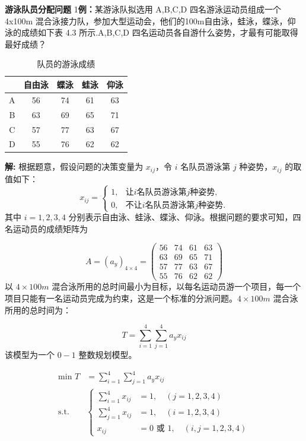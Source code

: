     \begin{exbox}{\textbf{游泳队员分配问题}}
        1\textbf{例：}某游泳队拟选用 A,B,C,D 四名游泳运动员组成一个 4x100m 混合泳接力队，参加大型运动会，他们的100m自由泳，蛙泳，蝶泳，仰泳的成绩如下表 4.3 所示.A,B,C,D 四名运动员各自游什么姿势，才最有可能取得最好成绩？
        \begin{table}[H]
            \centering
            \label{tab:4.3}
            \renewcommand{\arraystretch}{1.5}
            \begin{tabular}{|c|c|c|c|c|}
                \hline
                & 自由泳 & 蝶泳 & 蛙泳 & 仰泳 \\ \hline
                A & 56 & 74 & 61 & 63 \\ \hline
                B & 63 & 69 & 65 & 71 \\ \hline
                C & 57 & 77 & 63 & 67 \\ \hline
                D & 55 & 76 & 62 & 62 \\ \hline
            \end{tabular}
            \caption{队员的游泳成绩}
        \end{table}
        \textbf{解:} 根据题意，假设问题的决策变量为 $x_{ij}$，令 $i$ 名队员游泳第 $j$ 种姿势，$x_{ij}$ 的取值如下：
        \[
        x_{ij} =
        \begin{cases}
        1, & \text{让} i \text{名队员游泳第} j \text{种姿势,} \\
        0, & \text{不让} i \text{名队员游泳第} j \text{种姿势.}
        \end{cases}
        \]
        其中 $i=1,2,3,4$ 分别表示自由泳、蛙泳、蝶泳、仰泳。根据问题的要求可知，四名运动员的成绩矩阵为

        \[
        A = \left( a_{y} \right)_{4 \times 4} =
        \begin{pmatrix}
        56 & 74 & 61 & 63 \\
        63 & 69 & 65 & 71 \\
        57 & 77 & 63 & 67 \\
        55 & 76 & 62 & 62
        \end{pmatrix}
        \]
        以 $4 \times 100m$ 混合泳所用的总时间最小为目标，以每名运动员游一个项目，每一个项目只能有一名运动员完成为约束，这是一个标准的分派问题。$4 \times 100m$ 混合泳所用的总时间为：

        \[
        T = \sum_{i=1}^4 \sum_{j=1}^4 a_{y} x_{ij}
        \]
        该模型为一个 $0-1$ 整数规划模型。

        \begin{align*}
            \text{min } T &= \sum_{i=1}^4 \sum_{j=1}^4 a_{y} x_{ij} \\
            \text{s.t.} \quad & \left\{
            \begin{aligned}
            \sum_{i=1}^4 x_{ij} &= 1, \quad (j=1,2,3,4) \\
            \sum_{j=1}^4 x_{ij} &= 1, \quad (i=1,2,3,4) \\
            x_{ij} &= 0 \text{ 或 } 1, \quad (i,j=1,2,3,4)
            \end{aligned}
            \right.
        \end{align*}

    \end{exbox}
